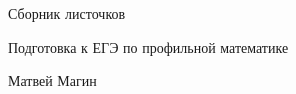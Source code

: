 \begin{titlepage}
    \begin{center}
        \vspace*{4cm}

        \HUGE
        \textsf{Сборник листочков}

        \vspace{0.5cm}
        \LARGE
        \textsf{Подготовка к ЕГЭ по профильной математике}

        \vspace{15cm}

        \textsf{Матвей Магин}

        \vfill








    \end{center}
\end{titlepage}